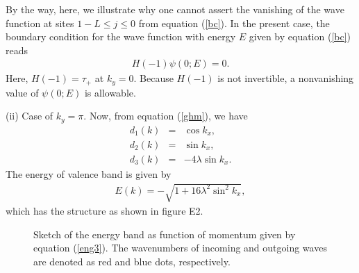 \documentclass[aps,pra,amsmath,twocolumn,showpacs,bibnotes,10pt]{revtex4-1}
\begin{document}
By the way, here, we illustrate why one cannot assert the vanishing of the wave function at sites $1-L\le j\le 0$ from equation (\ref{bc}). In the present case, the boundary condition for the wave function with energy $E$ given by equation (\ref{bc}) reads
\begin{eqnarray}
H(-1)\psi(0;E) = 0. \label{eng2}
\end{eqnarray}
Here, $H(-1) = \tau_+$ at $k_y = 0$. Because $H(-1)$ is not invertible, a nonvanishing value of $\psi(0;E)$ is allowable.  

(ii) Case of $k_y = \pi$. Now, from equation (\ref{ghm}), we have   
\begin{eqnarray}
d_1(k) &=& \cos k_x,     \nonumber\\
d_2(k) &=& \sin k_x,      \nonumber\\
d_3(k) &=& -4\lambda \sin k_x. \nonumber 
\end{eqnarray}
The energy of valence band is given by  
\begin{eqnarray}
E(k)  = -\sqrt{1+16\lambda^2\sin^2 k_x}, \label{eng3}
\end{eqnarray}
which has the structure as shown in figure E2. 

\begin{figure}[t]
\centerline{}
\caption{Sketch of the energy band as function of momentum given by equation (\ref{eng3}). The wavenumbers of incoming and outgoing waves are denoted as red and blue dots, respectively. } 
\end{figure}
\end{document}
